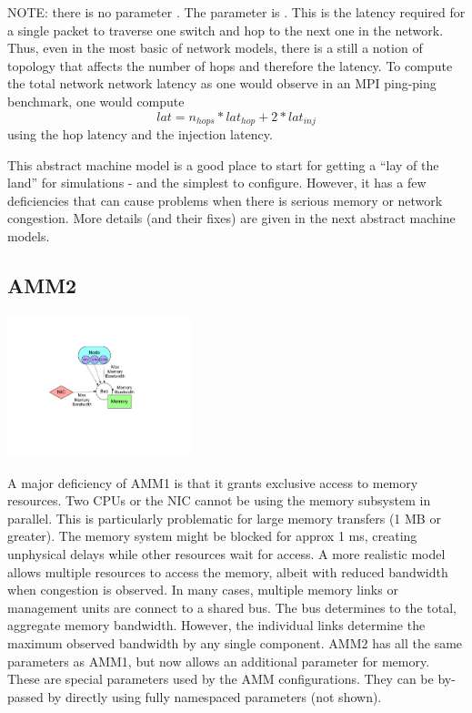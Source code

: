 NOTE: there is no parameter .
The parameter is .
This is the latency required for a single packet to traverse one switch and hop to the next one in the network.
Thus, even in the most basic of network models, there is a still a notion of topology that affects the number of hops and therefore the latency.
To compute the total network network latency as one would observe in an MPI ping-ping benchmark, one would compute
\[
lat = n_{hops} * lat_{hop} + 2*lat_{inj}
\]
using the hop latency and the injection latency.

This abstract machine model is a good place to start for getting a ``lay of the land'' for simulations - and the simplest to configure.
However, it has a few deficiencies that can cause problems when there is serious memory or network congestion.
More details (and their fixes) are given in the next abstract machine models. 	

\subsection{AMM2}

\begin{center}
\includegraphics[width=0.4\textwidth]{figures/amm/amm2_membus.pdf}
\end{center}

\label{subsec:ammTwo}
A major deficiency of AMM1 is that it grants exclusive access to memory resources.
Two CPUs or the NIC cannot be using the memory subsystem in parallel.
This is particularly problematic for large memory transfers (1 MB or greater).
The memory system might be blocked for approx 1 ms,
creating unphysical delays while other resources wait for access.
A more realistic model allows multiple resources to access the memory,
albeit with reduced bandwidth when congestion is observed.
In many cases, multiple memory links or management units are connect to a shared bus.
The bus determines to the total, aggregate memory bandwidth.
However, the individual links determine the maximum observed bandwidth by any single component.
AMM2 has all the same parameters as AMM1, but now allows an additional parameter for memory.
These are special parameters used by the AMM configurations.
They can be by-passed by directly using fully namespaced parameters (not shown).

